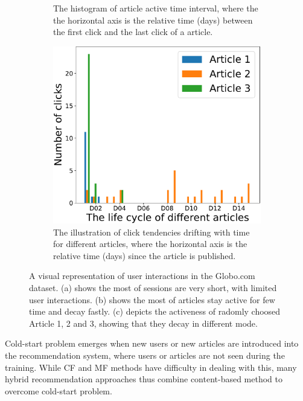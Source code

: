 \begin{figure}[htp]
\begin{subfigure}[t]{0.3\textwidth}
        \caption{The histogram of article active time interval, where the the horizontal axis is the relative time (days) between the first click and the last click of a article.}
    \end{subfigure}
    \quad
    \begin{subfigure}[t]{0.3\textwidth}
        \includegraphics[width=\textwidth]{fig/data_distribution_c.pdf}
        \caption{The illustration of click tendencies drifting with time for different articles, where the horizontal axis is the relative time (days) since the article is published.}
    \end{subfigure}
    \caption{A visual representation of user interactions in the Globo.com dataset. (a) shows the most of sessions are very short, with limited user interactions. (b) shows the most of articles stay active for few time and decay fastly. (c) depicts the activeness of radomly choosed Article 1, 2 and 3, showing that they decay in different mode.}
    \label{fig:data_distribution}
\end{figure}

Cold-start problem emerges when new users or new articles are introduced into the recommendation system, where users or articles are not seen during the training. While CF and MF methods have difficulty in dealing with this, many hybrid recommendation approaches thus combine content-based method to overcome cold-start problem. 

